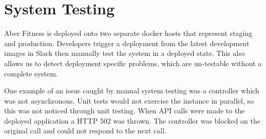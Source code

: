 \section{System Testing}
\par
Aber Fitness is deployed onto two separate docker hosts that represent staging and production. Developers trigger a deployment from the latest development images in Slack then manually test the system in a deployed state. This also allows us to detect deployment specific problems, which are un-testable without a complete system.

\par
One example of an issue caught by manual system testing was a controller which was not asynchronous. Unit tests would not exercise the instance in parallel, so this was not noticed through unit testing. When API calls were made to the deployed application a HTTP 502 was thrown. The controller was blocked on the original call and could not respond to the next call.
